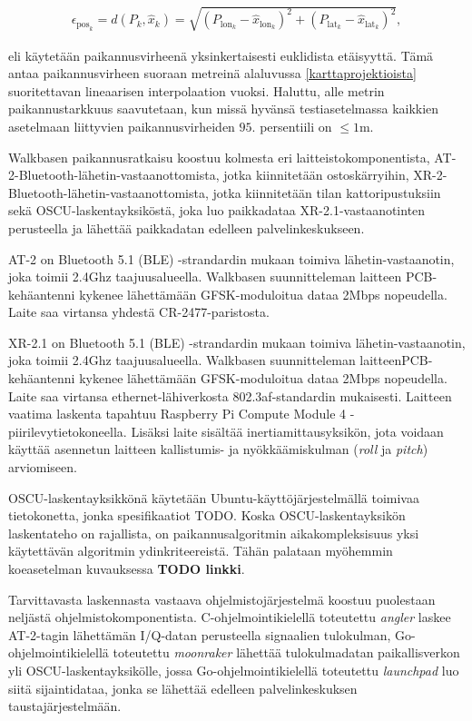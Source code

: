 \documentclass[
  12pt,
  a4paper, twoside]{book}
\begin{document}
\begin{align}\label{paikannusvirhe}
\epsilon_{\text{pos}_k} = d(P_k,\hat{x}_k) = \sqrt{(P_{\text{lon}_k}-\hat{x}_{\text{lon}_k})^2+(P_{\text{lat}_k}-\hat{x}_{\text{lat}_k})^2}
,\end{align}

eli käytetään paikannusvirheenä yksinkertaisesti euklidista etäisyyttä. Tämä antaa paikannusvirheen suoraan metreinä alaluvussa \ref{karttaprojektioista} suoritettavan lineaarisen interpolaation vuoksi. Haluttu, alle metrin paikannustarkkuus saavutetaan, kun missä hyvänsä testiasetelmassa kaikkien asetelmaan liittyvien paikannusvirheiden \(95.\) persentiili on \(\leq1\)m.

Walkbasen paikannusratkaisu koostuu kolmesta eri laitteistokomponentista, AT-2-Bluetooth-lähetin-vastaanottomista, jotka kiinnitetään ostoskärryihin, XR-2-Bluetooth-lähetin-vastaanottomista, jotka kiinnitetään tilan kattoripustuksiin sekä OSCU-laskentayksiköstä, joka luo paikkadataa XR-2.1-vastaanotinten perusteella ja lähettää paikkadatan edelleen palvelinkeskukseen.

AT-2 on Bluetooth 5.1 (BLE) -strandardin mukaan toimiva lähetin-vastaanotin, joka toimii 2.4Ghz taajuusalueella. Walkbasen suunnitteleman laitteen PCB-kehäantenni kykenee lähettämään GFSK-moduloitua dataa 2Mbps nopeudella. Laite saa virtansa yhdestä CR-2477-paristosta.

XR-2.1 on Bluetooth 5.1 (BLE) -strandardin mukaan toimiva lähetin-vastaanotin, joka toimii 2.4Ghz taajuusalueella. Walkbasen suunnitteleman laitteenPCB-kehäantenni kykenee lähettämään GFSK-moduloitua dataa 2Mbps nopeudella. Laite saa virtansa ethernet-lähiverkosta 802.3af-standardin mukaisesti. Laitteen vaatima laskenta tapahtuu Raspberry Pi Compute Module 4 -piirilevytietokoneella. Lisäksi laite sisältää inertiamittausyksikön, jota voidaan käyttää asennetun laitteen kallistumis- ja nyökkäämiskulman (\emph{roll} ja \emph{pitch}) arviomiseen.

OSCU-laskentayksikkönä käytetään Ubuntu-käyttöjärjestelmällä toimivaa tietokonetta, jonka spesifikaatiot TODO. Koska OSCU-laskentayksikön laskentateho on rajallista, on paikannusalgoritmin aikakompleksisuus yksi käytettävän algoritmin ydinkriteereistä. Tähän palataan myöhemmin koeasetelman kuvauksessa \textbf{TODO linkki}.

Tarvittavasta laskennasta vastaava ohjelmistojärjestelmä koostuu puolestaan neljästä ohjelmistokomponentista. C-ohjelmointikielellä toteutettu \emph{angler} laskee AT-2-tagin lähettämän I/Q-datan perusteella signaalien tulokulman, Go-ohjelmointikielellä toteutettu \emph{moonraker} lähettää tulokulmadatan paikallisverkon yli OSCU-laskentayksikölle, jossa Go-ohjelmointikielellä toteutettu \emph{launchpad} luo siitä sijaintidataa, jonka se lähettää edelleen palvelinkeskuksen taustajärjestelmään.
\end{document}
